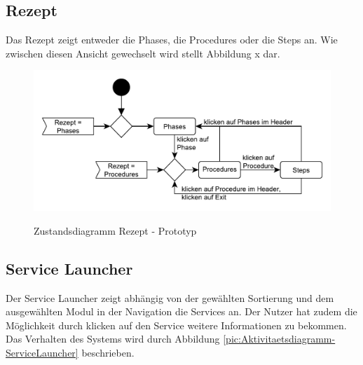 \subsection{Rezept}
Das Rezept zeigt entweder die Phases, die Procedures oder die Steps an. Wie zwischen diesen Ansicht gewechselt wird stellt Abbildung x dar.
\begin{figure}[htbp]
\centering
\includegraphics[scale=0.6]{DA_files/UML/Prototyp/Zustandsdiagramm-Rezept.pdf}
\label{pic:Zustandsdiagramm-Rezept}
\caption{Zustandsdiagramm Rezept - Prototyp}
\end{figure}



\subsection{Service Launcher}
Der Service Launcher zeigt abhängig von der gewählten Sortierung und dem ausgewählten Modul in der Navigation die Services an. Der Nutzer hat zudem die Möglichkeit durch klicken auf den Service weitere Informationen zu bekommen. Das Verhalten des Systems wird durch Abbildung \ref{pic:Aktivitaetsdiagramm-ServiceLauncher} beschrieben.

